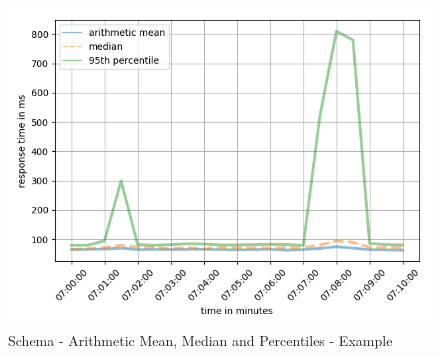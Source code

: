 \begin{figure}[ht]
	\centering
  \includegraphics[width=1\textwidth]{mean_average_percentile_plot.png}
	\caption{Schema - Arithmetic Mean, Median and Percentiles - Example}
	\label{schema_mean_average_percentile_plot}
\end{figure}

